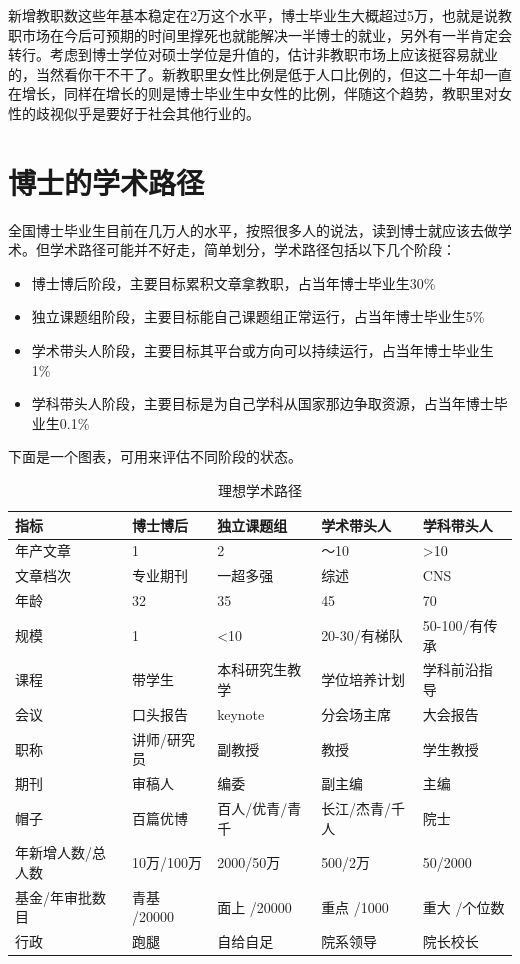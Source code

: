 \documentclass[]{tufte-book}
\begin{document}
新增教职数这些年基本稳定在2万这个水平，博士毕业生大概超过5万，也就是说教职市场在今后可预期的时间里撑死也就能解决一半博士的就业，另外有一半肯定会转行。考虑到博士学位对硕士学位是升值的，估计非教职市场上应该挺容易就业的，当然看你干不干了。新教职里女性比例是低于人口比例的，但这二十年却一直在增长，同样在增长的则是博士毕业生中女性的比例，伴随这个趋势，教职里对女性的歧视似乎是要好于社会其他行业的。

\hypertarget{ux535aux58ebux7684ux5b66ux672fux8defux5f84}{%
\section{博士的学术路径}\label{ux535aux58ebux7684ux5b66ux672fux8defux5f84}}

全国博士毕业生目前在几万人的水平，按照很多人的说法，读到博士就应该去做学术。但学术路径可能并不好走，简单划分，学术路径包括以下几个阶段：

\begin{itemize}
\item
  博士博后阶段，主要目标累积文章拿教职，占当年博士毕业生30\%
\item
  独立课题组阶段，主要目标能自己课题组正常运行，占当年博士毕业生5\%
\item
  学术带头人阶段，主要目标其平台或方向可以持续运行，占当年博士毕业生1\%
\item
  学科带头人阶段，主要目标是为自己学科从国家那边争取资源，占当年博士毕业生0.1\%
\end{itemize}

下面是一个图表，可用来评估不同阶段的状态。

\begin{longtable}[t]{lllll}
\caption{\label{tab:unnamed-chunk-1}理想学术路径}\\
\toprule
指标 & 博士博后 & 独立课题组 & 学术带头人 & 学科带头人\\
\midrule
年产文章 & 1 & 2 & ～10 & >10\\
文章档次 & 专业期刊 & 一超多强 & 综述 & CNS\\
年龄 & 32 & 35 & 45 & 70\\
规模 & 1 & <10 & 20-30/有梯队 & 50-100/有传承\\
课程 & 带学生 & 本科研究生教学 & 学位培养计划 & 学科前沿指导\\
\addlinespace
会议 & 口头报告 & keynote & 分会场主席 & 大会报告\\
职称 & 讲师/研究员 & 副教授 & 教授 & 学生教授\\
期刊 & 审稿人 & 编委 & 副主编 & 主编\\
帽子 & 百篇优博 & 百人/优青/青千 & 长江/杰青/千人 & 院士\\
年新增人数/总人数 & 10万/100万 & 2000/50万 & 500/2万 & 50/2000\\
\addlinespace
基金/年审批数目 & 青基 /20000 & 面上 /20000 & 重点 /1000 & 重大 /个位数\\
行政 & 跑腿 & 自给自足 & 院系领导 & 院长校长\\
\bottomrule
\end{longtable}
\end{document}
